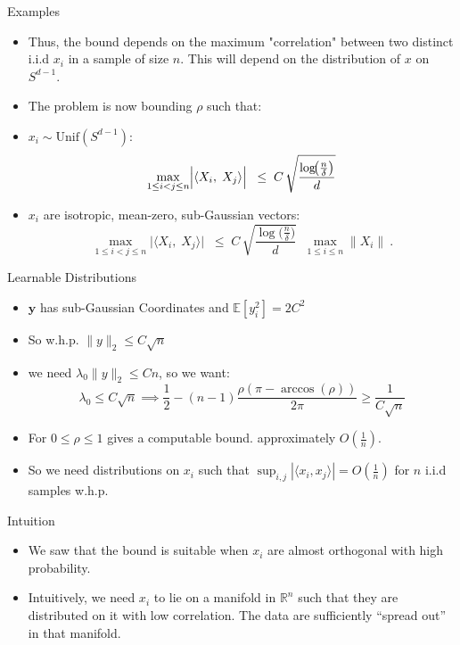 \documentclass[serif, aspectratio=169]{beamer}
\newcommand{\E}{\mathbb{E}}
\begin{document}
\begin{frame}{Examples}
	\begin{itemize}
		
		\item Thus, the bound depends on the maximum "correlation" between two distinct i.i.d \(x_i\) in a sample of size \(n\). This will depend on the distribution of \(x\) on \(S^{d-1}\).
		\item The problem is now bounding \(\rho\) such that:
		
		\item \(x_i \sim \text{Unif}(S^{d-1})\):
		\[
		\max_{1 \le i < j \le n}
		\Bigl|\langle X_i,\;X_j\rangle\Bigr|
		\;\;\le\;
		C\,
		\sqrt{\frac{\log\!\bigl(\tfrac{n}{\delta}\bigr)}{d}}
		\,
		\]
		
		\item \(x_i\) are isotropic, mean-zero, sub-Gaussian vectors:
		\[
		\max_{1 \le i < j \le n}
		\bigl|\langle X_i,\;X_j\rangle\bigr|
		\;\;\le\;
		C\,
		\sqrt{\frac{\log\!\bigl(\tfrac{n}{\delta}\bigr)}{d}}
		\;\;\max_{1\le i\le n}\|X_i\|\ .
		\]
	\end{itemize}
\end{frame}

\begin{frame}{Learnable Distributions}
	\begin{itemize}
		\item \(\mathbf{y}\) has sub-Gaussian Coordinates and \(\E[y_i^2] = 2C^2\)
		\item So w.h.p. \(\|y\|_2 \leq C\sqrt{n}\)
		\item we need \(\lambda_0 \|y\|_2 \leq Cn\), so we want:
		\[
		\lambda_0 \leq C\sqrt{n} \implies  \frac{1}{2} - (n-1)\frac{\rho(\pi-\arccos(\rho))}{2\pi} \geq \frac{1}{C\sqrt{n}}
		\]
		\item For \(0 \leq \rho \leq 1\) gives a computable bound. approximately \(O(\frac{1}{n})\).
		\item So we need distributions on \(x_i\) such that \(\sup_{i,j}|\langle x_i, x_j \rangle| = O(\frac{1}{n})\) for \(n\) i.i.d samples w.h.p.
	\end{itemize}
\end{frame}


\begin{frame}{Intuition}
	\begin{itemize}
\item We saw that the bound is suitable  when \(x_i\) are almost orthogonal with high probability.

\item Intuitively, we need \(x_i\) to lie on a manifold in \(\mathbb{R}^n\) such that they are distributed on it with low correlation. The data are sufficiently “spread out” in that manifold.
	\end{itemize}
\end{frame}
\end{document}
